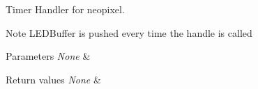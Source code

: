 Timer Handler for neopixel. 

\begin{DoxyNote}{Note}
L\+E\+D\+Buffer is pushed every time the handle is called 
\end{DoxyNote}

\begin{DoxyParams}{Parameters}
{\em None} & \\
\hline
\end{DoxyParams}

\begin{DoxyRetVals}{Return values}
{\em None} & \\
\hline
\end{DoxyRetVals}
